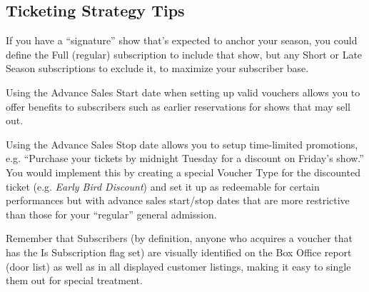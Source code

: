 

\subsection{Ticketing Strategy Tips}
\label{sec:ticketingstrategy}

If you have a ``signature'' show that's expected to anchor your season,
you could define the Full (regular) subscription to include that show,
but any Short or Late Season subscriptions to exclude it, to maximize
your subscriber base.

Using the Advance Sales Start date when setting up valid vouchers allows
you to offer benefits to subscribers such as earlier reservations for
shows that may sell out.

Using the Advance Sales Stop date allows you to setup time-limited
promotions, e.g. ``Purchase your tickets by midnight Tuesday for a
discount on Friday's show.''  You would implement this by creating a
special Voucher Type for the discounted ticket (e.g. \emph{Early Bird
  Discount}) and set it up as redeemable for certain performances but
with advance sales start/stop dates that are more restrictive than those
for your ``regular'' general admission.

Remember that Subscribers (by definition, anyone who acquires a voucher
that has the Is Subscription flag set) are visually identified on the
Box Office report (door list) as well as in all displayed customer
listings, making it easy to single them out for special treatment.

